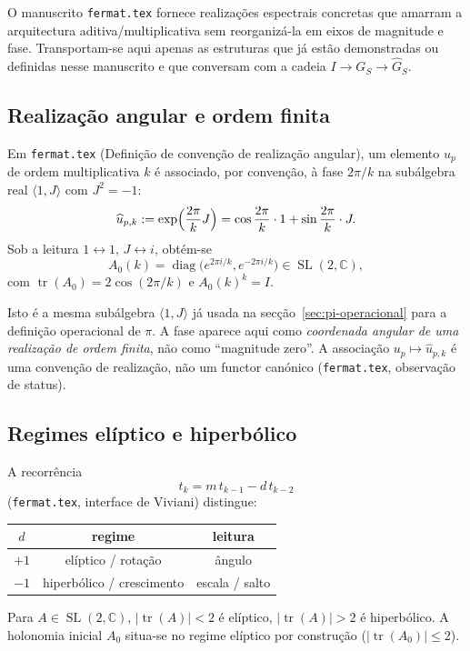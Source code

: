 \documentclass[11pt,a4paper]{article}
\begin{document}
O manuscrito \texttt{fermat.tex} fornece realizações espectrais concretas que amarram a arquitectura aditiva/multiplicativa sem reorganizá-la em eixos de magnitude e fase. Transportam-se aqui apenas as estruturas que já estão demonstradas ou definidas nesse manuscrito e que conversam com a cadeia \(I\to G_S\to\widehat G_S\).

\subsection{Realização angular e ordem finita}

Em \texttt{fermat.tex} (Definição de convenção de realização angular), um elemento \(u_p\) de ordem multiplicativa \(k\) é associado, por convenção, à fase \(2\pi/k\) na subálgebra real \(\langle 1,J\rangle\) com \(J^2=-1\):
\[
\widehat u_{p,k}:=\exp\Bigl(\frac{2\pi}{k}J\Bigr)
=\cos\frac{2\pi}{k}\cdot 1+\sin\frac{2\pi}{k}\cdot J.
\]
Sob a leitura \(1\leftrightarrow 1\), \(J\leftrightarrow i\), obtém-se
\[
A_0(k)=\operatorname{diag}\bigl(e^{2\pi i/k},e^{-2\pi i/k}\bigr)\in\operatorname{SL}(2,\mathbb C),
\]
com \(\operatorname{tr}(A_0)=2\cos(2\pi/k)\) e \(A_0(k)^k=I\).

Isto é a mesma subálgebra \(\langle 1,J\rangle\) já usada na secção~\ref{sec:pi-operacional} para a definição operacional de \(\pi\). A fase aparece aqui como \emph{coordenada angular de uma realização de ordem finita}, não como ``magnitude zero''. A associação \(u_p\mapsto\widehat u_{p,k}\) é uma convenção de realização, não um functor canónico (\texttt{fermat.tex}, observação de status).

\subsection{Regimes elíptico e hiperbólico}

A recorrência
\[
t_k=m\,t_{k-1}-d\,t_{k-2}
\]
(\texttt{fermat.tex}, interface de Viviani) distingue:
\begin{center}
\small
\begin{tabular}{@{}ccc@{}}
\toprule
\(d\) & regime & leitura \\
\midrule
\(+1\) & elíptico / rotação & ângulo \\
\(-1\) & hiperbólico / crescimento & escala / salto \\
\bottomrule
\end{tabular}
\end{center}
Para \(A\in\operatorname{SL}(2,\mathbb C)\), \(\lvert\operatorname{tr}(A)\rvert<2\) é elíptico, \(\lvert\operatorname{tr}(A)\rvert>2\) é hiperbólico. A holonomia inicial \(A_0\) situa-se no regime elíptico por construção (\(\lvert\operatorname{tr}(A_0)\rvert\le 2\)).
\end{document}
